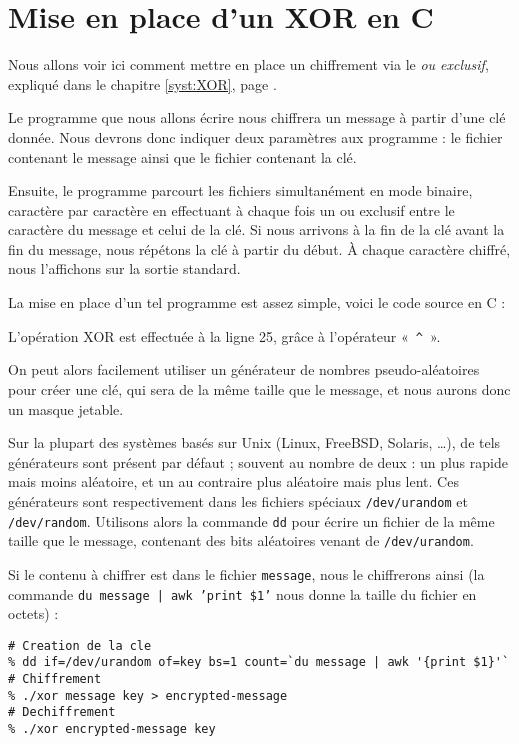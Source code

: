 \chapter{Mise en place d'un XOR en C}
Nous allons voir ici comment mettre en place un chiffrement via le
\emph{ou exclusif}, expliqué dans le chapitre \ref{syst:XOR}, page
\pageref{syst:XOR}.

Le programme que nous allons écrire nous chiffrera un message à partir
d'une clé donnée. Nous devrons donc indiquer deux paramètres aux
programme : le fichier contenant le message ainsi que le fichier
contenant la clé.

Ensuite, le programme parcourt les fichiers simultanément en mode
binaire, caractère par caractère en effectuant à chaque fois un ou
exclusif entre le caractère du message et celui de la clé. Si nous
arrivons à la fin de la clé avant la fin du message, nous répétons la
clé à partir du début. À chaque caractère chiffré, nous l'affichons
sur la sortie standard.

La mise en place d'un tel programme est assez simple, voici le code
source en C : 
\lstset{language=C}


L'opération XOR est effectuée à la ligne 25, grâce à l'opérateur
«~\texttt{\^}~».

On peut alors facilement utiliser un générateur de nombres
pseudo-aléatoires pour créer une clé, qui sera de la même taille que
le message, et nous aurons donc un masque jetable.

Sur la plupart des systèmes basés sur Unix (Linux, FreeBSD, Solaris,
\dots), de tels générateurs sont présent par défaut ; souvent au
nombre de deux : un plus rapide mais moins aléatoire, et un au
contraire plus aléatoire mais plus lent. Ces générateurs sont
respectivement dans les fichiers spéciaux \texttt{/dev/urandom} et
\texttt{/dev/random}. Utilisons alors la commande \texttt{dd} pour
écrire un fichier de la même taille que le message, contenant des bits
aléatoires venant de \texttt{/dev/urandom}.

Si le contenu à chiffrer est dans le fichier \texttt{message}, nous le
chiffrerons ainsi (la commande \texttt{du message | awk '{print \$1}'}
nous donne la taille du fichier en octets) : 
\lstset{language=csh}
\begin{lstlisting}
# Creation de la cle
% dd if=/dev/urandom of=key bs=1 count=`du message | awk '{print $1}'`
# Chiffrement
% ./xor message key > encrypted-message
# Dechiffrement
% ./xor encrypted-message key 
\end{lstlisting}

